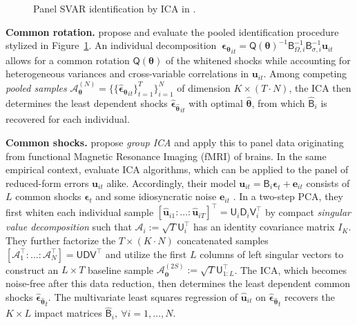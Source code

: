 \begin{figure}[ht]	%
	\centering
	\caption{Panel SVAR identification by ICA in \citet{HerwartzWang2024}.}
	\resizebox{0.75\textwidth}{!}{
		}
	\label{fig:PSVAR}
\end{figure}


\textbf{Common rotation.} \citet{HerwartzWang2024} propose and evaluate the pooled identification procedure stylized in Figure~\ref{fig:PSVAR}. An individual decomposition $ \ \boldsymbol{\epsilon_\theta}_{it} = \mathsf{Q} \left( \boldsymbol{\theta} \right)^{-1} \mathsf{B}_{\Omega,i}^{-1} \mathsf{B}_{\sigma,i}^{-1} \boldsymbol{u}_{it} $ allows for a common rotation $ \mathsf{Q} \left( \boldsymbol{\theta} \right) $ of the whitened shocks while accounting for heterogeneous variances and cross-variable correlations in $ \boldsymbol{u}_{it} $. Among competing \textit{pooled samples} $ \mathcal{A}_{\boldsymbol{\theta}}^{(N)} = \{ \{ \boldsymbol{\widehat{\epsilon}_\theta}_{it} \}^T_{t=1} \}^N_{i=1} $ of dimension $ K \times (T \cdot N) $, the ICA then determines the least dependent shocks $ \boldsymbol{\widehat{\epsilon}_{\widehat{\theta}}}_{it} $ with optimal $ \boldsymbol{\widehat{\theta}} $, from which $ \widehat{\mathsf{B}}_i $ is recovered for each individual.


\textbf{Common shocks.} \citet{CalhounEtAl2001} propose \textit{group ICA} and apply this to panel data originating from functional Magnetic Resonance Imaging (fMRI) of brains. In the same empirical context, \citet{RiskEtAl2014} evaluate ICA algorithms, which can be applied to the panel of reduced-form errors $ \boldsymbol{u}_{it} $ alike. Accordingly, their model $ \boldsymbol{u}_{it} = \mathsf{B}_i \boldsymbol{\epsilon}_{t} + \boldsymbol{e}_{it} $ consists of $ L $ common shocks $ \boldsymbol{\epsilon}_{t} $ and some idiosyncratic noise $ \boldsymbol{e}_{it} $ \citep[p.~227]{RiskEtAl2014}. In a two-step PCA, they first whiten each individual sample $ \left[\boldsymbol{\widehat{u}}_{i1}: \ldots: \boldsymbol{\widehat{u}}_{iT} \right]^\top = \mathsf{U}_i^{\ } \mathsf{D}_i^{\ } \mathsf{V}_i^\top $ by compact \textit{singular value decomposition} such that $ \mathcal{A}_i := \sqrt{T} \mathsf{U}_i^\top $ has an identity covariance matrix $ I_K $. They further factorize the $ T \times (K \cdot N) $ concatenated samples $ \left[ \mathcal{A}_1^\top : \ldots : \mathcal{A}_N^\top \right] = \mathsf{U} \mathsf{D} \mathsf{V}^\top $ and utilize the first $ L $ columns of left singular vectors to construct an $ L \times T $ baseline sample $ \mathcal{A}_{\boldsymbol{0}}^{(2S)} := \sqrt{T} \mathsf{U}_{1:L}^\top $. The ICA, which becomes noise-free after this data reduction, then determines the least dependent common shocks $ \boldsymbol{\widehat{\epsilon}_{\widehat{\theta}}}_t $. The multivariate least squares regression of $ \boldsymbol{\widehat{u}}_{it} $ on $ \boldsymbol{\widehat{\epsilon}_{\widehat{\theta}}}_t $ recovers the $ K \times L $ impact matrices $ \mathsf{\widehat{B}}_i, \ \forall i=1,\ldots,N $.


